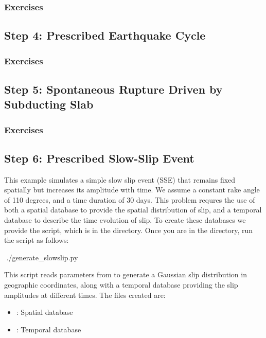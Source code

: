 \subsubsection{Exercises}

\subsection{Step 4: Prescribed Earthquake Cycle}

\subsubsection{Exercises}




\subsection{Step 5: Spontaneous Rupture Driven by Subducting Slab}

\subsubsection{Exercises}

\subsection{Step 6: Prescribed Slow-Slip Event}

This example simulates a simple slow slip event (SSE) that remains
fixed spatially but increases its amplitude with time. We assume a
constant rake angle of 110 degrees, and a time duration of 30
days. This problem requres the use of both a spatial database to
provide the spatial distribution of slip, and a temporal database to
describe the time evolution of slip. To create these databases we
provide the  script, which is in the
 directory. Once you are in the
 directory, run the script as follows:
\begin{shell}
$$ ./generate_slowslip.py
\end{shell}
This script reads parameters from  to
generate a Gaussian slip distribution in geographic coordinates, along
with a temporal database providing the slip amplitudes at different
times. The files created are:
\begin{itemize}
\item {}: Spatial database
\item {}: Temporal database
\end{itemize}

